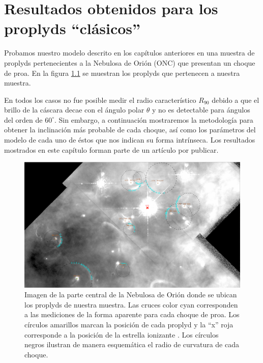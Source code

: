 \chapter[Resultados Obtenidos]{Resultados obtenidos para los proplyds ``clásicos''}
\label{chap:proplyds}
\thispagestyle{empty}
Probamos nuestro modelo descrito en los capítulos anteriores en una muestra de proplyds pertenecientes a la Nebulosa de Orión (ONC) que presentan un choque de proa. En la figura \ref{fig:proplyds-map} se muestran los proplyds que pertenecen a nuestra muestra.

En todos los casos no fue posible medir el radio característico $R_{90}$ debido a que el brillo de la cáscara decae con el ángulo polar $\theta$ y no es detectable para ángulos del orden de $60^\circ$. Sin embargo, a continuación mostraremos la metodología para obtener la inclinación más probable de cada choque, así como los parámetros del modelo de cada uno de éstos que nos indican su forma intrínseca. Los resultados mostrados en este capítulo forman parte de un artículo por publicar.

\begin{figure}
  \centering
    \includegraphics[width=\linewidth]{./Figures/LV-full-field-annotated}
    \caption{Imagen de la parte central de la Nebulosa de Orión donde se ubican los proplyds de nuestra muestra. Las cruces color cyan corresponden a las mediciones de la forma aparente para cada choque de proa. Los círculos amarillos marcan la posición de cada proplyd y la ``x'' roja corresponde a la posición de la estrella ionizante \thC{}. Los círculos negros ilustran de manera esquemática el radio de curvatura de cada choque.}
    \label{fig:proplyds-map}
\end{figure}

